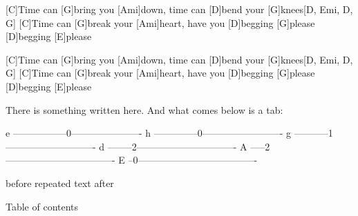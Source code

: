 \vfil\eject


[C]Time can [G]bring you [Ami]down,
time can [D]bend your [G]knees[D, Emi, D, G]
[C]Time can [G]break your [Ami]heart,
have you [D]begging [G]please [D]begging [E]please


[C]Time can [G]bring you [Ami]down,
time can [D]bend your [G]knees[D, Emi, D, G]
[C]Time can [G]break your [Ami]heart,
have you [D]begging [G]please [D]begging [E]please

\bextra
There is something
written here.
And what comes below is a tab:
\eextra

\btab
e -----------------0----------------------
h --------------0-------------------------
g -----------1----------------------------
d --------2-------------------------------
A -----2----------------------------------
E --0-------------------------------------
\etab

before \brep repeated text \erep{} after

\esong







\centerline{\TitleFont Table of contents}
\vskip5mm

\InsertTOC


\bye
